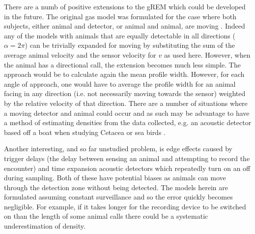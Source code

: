 \documentclass[a4paper,10pt,reqno,oneside]{amsart}
\begin{document}
There are a numb of positive extensions to the gREM which could be developed in the future. The original gas model was formulated for the case where both subjects, either animal and detector, or animal and animal, are moving \citep{Hutchinson_Waser_2007}. Indeed any of the models with animals that are equally detectable in all directions ($\alpha = 2\pi$) can be trivially expanded for moving by substituting the sum of the average animal velocity and the sensor velocity for $v$ as used here. However, when the animal has a directional call, the extension becomes much less simple. The approach would be to calculate again the mean profile width. However, for each angle of approach, one would have to average the profile width for an animal facing in any direction (i.e. not necessarily moving towards the sensor) weighted by the relative velocity of that direction. There are a number of situations where a moving detector and animal could occur and as such may be advantage to have a method of estimating densities from the data collected, e.g. an acoustic detector based off a boat when studying Cetacea or sea birds \citep{yack2013passive}.

Another interesting, and so far unstudied problem, is edge effects caused by trigger delays (the delay between sensing an animal and attempting to record the encounter) and time expansion acoustic detectors which repeatedly turn on an off during sampling. Both of these have potential biases as animals can move through the detection zone without being detected. The models herein are formulated assuming constant surveillance and so the error quickly becomes negligible. For example, if it takes longer for the recording device to be switched on than the length of some animal calls there could be a systematic underestimation of density. 
                  

	
	
\end{document}
